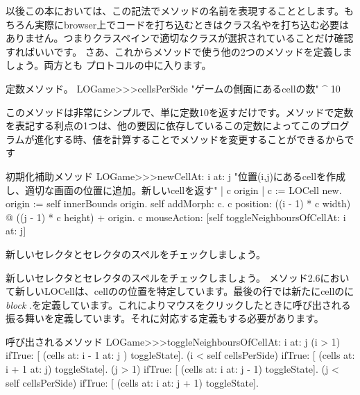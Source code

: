 \documentclass[a4paper,10pt,twoside]{book}
\begin{document}
以後この本においては、この記法でメソッドの名前を表現することとします。もちろん実際にbrowser上でコードを打ち込むときはクラス名や\ct{>>>}を打ち込む必要はありません。つまりクラスペインで適切なクラスが選択されていることだけ確認すればいいです。
さあ、これからメソッドで使う他の2つのメソッドを定義しましょう。両方とも プロトコルの中に入ります。
\begin{method}[sbegamecellsperside]{定数メソッド。}
LOGame>>>cellsPerSide
   "ゲームの側面にあるcellの数"
   ^ 10
\end{method}

このメソッドは非常にシンプルで、単に定数10を返すだけです。メソッドで定数を表記する利点の1つは、他の要因に依存しているこの定数によってこのプログラムが進化する時、値を計算することでメソッドを変更することができるからです

\begin{method}[newCellAt:at:]{初期化補助メソッド}
LOGame>>>newCellAt: i at: j
   "位置(i,j)にあるcellを作成し、適切な画面の位置に追加。新しいcellを返す"
   | c origin |
   c := LOCell new.
   origin := self innerBounds origin.
   self addMorph: c.
   c position: ((i - 1) * c width) @ ((j - 1) * c height) + origin.
   c mouseAction: [self toggleNeighboursOfCellAt: i at: j]
\end{method}

新しいセレクタとセレクタのスペルをチェックしましょう。

 新しいセレクタとセレクタのスペルをチェックしましょう。
メソッド2.6において新しいLOCellは、cellのの位置を特定しています。最後の行では新たにcellのに\emph{block}
\mbox{.}を定義しています。これによりマウスをクリックしたときに呼び出される振る舞いを定義しています。それに対応する定義もする必要があります。

\begin{method}[toggleNeighboursOfCellAt:at:]{呼び出されるメソッド}
LOGame>>>toggleNeighboursOfCellAt: i at: j
   (i > 1) ifTrue: [ (cells at: i - 1 at: j ) toggleState].
   (i < self cellsPerSide) ifTrue: [ (cells at: i + 1 at: j) toggleState].
   (j > 1) ifTrue: [ (cells at: i  at: j - 1) toggleState].
   (j < self cellsPerSide) ifTrue: [ (cells at: i at: j + 1) toggleState].
\end{method}
\end{document}
